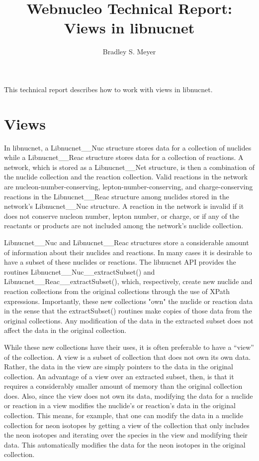 \documentclass{article}    %
\title{Webnucleo Technical Report: Views in libnucnet} %
\author{Bradley S. Meyer}
\begin{document}

\maketitle                 %


This technical report describes how to work with views in libnucnet.

\section{Views}

In libnucnet, a Libnucnet\_\_Nuc structure stores data for a collection
of nuclides while
a Libnucnet\_\_Reac structure stores data for a collection of
reactions.  A network, which
is stored as a Libnucnet\_\_Net structure,
is then a combination of the nuclide collection
and the reaction collection.  Valid
reactions in the network are nucleon-number-conserving,
lepton-number-conserving, and charge-conserving reactions in the
Libnucnet\_\_Reac structure among nuclides stored in the network's
Libnucnet\_\_Nuc structure.  A reaction in the network is invalid
if it does not conserve nucleon number, lepton number, or charge, or if
any of the reactants or products are not included among the network's
nuclide collection.

Libnucnet\_\_Nuc and Libnucnet\_\_Reac structures store a considerable
amount of information about their nuclides and reactions.  In many cases
it is desirable to have a subset of these nuclides or reactions.  The
libnucnet API provides the routines Libnucnet\_\_Nuc\_\_extractSubset()
and Libnucnet\_\_Reac\_\_extractSubset(), which, respectively, create
new nuclide and reaction collections from the original collections
through the use of XPath expressions.  Importantly, these new collections
"own" the nuclide or reaction data in the sense that the extractSubset()
routines make copies of those data from the original collections.  Any
modification of the data in the extracted subset does not affect the
data in the original collection.

While these new collections have their uses, it is often preferable to
have a ``view'' of the collection.  A view is a subset of collection
that does not own its own data.  Rather, the data in the view are simply
pointers to the data in the original collection.
An advantage of a view over an extracted subset, then, is that it requires a
considerably smaller amount of memory than the original
collection does.  Also, since the view does not own its data,
modifying the data for a nuclide or reaction in a view modifies the
nuclide's or reaction's data in the original collection.  This means,
for example, that one can modify the data in a nuclide collection
for neon isotopes by getting a view of the collection that only includes
the neon isotopes and iterating over the species in the view and modifying
their data.  This automatically modifies the data for the neon isotopes
in the original collection.
\end{document}
